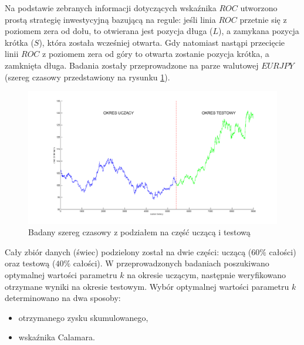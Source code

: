 Na podstawie zebranych informacji dotyczących wskaźnika $ROC$ utworzono prostą strategię inwestycyjną bazującą na regule: jeśli linia $ROC$ przetnie się z poziomem zera od dołu, to otwierana jest pozycja długa ($L$), a zamykana pozycja krótka ($S$), która została wcześniej otwarta. Gdy natomiast nastąpi przecięcie linii $ROC$ z poziomem zera od góry to otwarta zostanie pozycja krótka, a zamknięta długa. Badania zostały przeprowadzone na parze walutowej $EURJPY$ (szereg czasowy przedstawiony na rysunku \ref{rysunek2}). \\
\begin{figure}[h!]
\centering
\includegraphics[width = \textwidth]{podzialDanych.png}
\caption{Badany szereg czasowy z podziałem na część uczącą i testową}
\label{rysunek2}
\end{figure}
\FloatBarrier
Cały zbiór danych (świec) podzielony został na dwie części: uczącą ($60\%$ całości) oraz testową ($40\%$ całości). W przeprowadzonych badaniach poszukiwano optymalnej wartości parametru $k$ na okresie uczącym, następnie weryfikowano otrzymane wyniki na okresie testowym. Wybór optymalnej wartości parametru $k$ determinowano na dwa sposoby:
\begin{itemize}
\item otrzymanego zysku skumulowanego,
\item wskaźnika Calamara.
\end{itemize}

